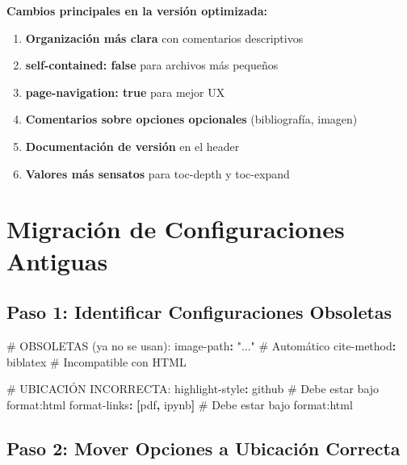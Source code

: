 \documentclass[
  doc,
  floatsintext,
  longtable,
  a4paper,
  nolmodern,
  notxfonts,
  notimes,
  12pt,
  colorlinks=true,linkcolor=blue,citecolor=blue,urlcolor=blue]{apa7}
\newenvironment{Shaded}{\begin{snugshade}}{\end{snugshade}}
\newcommand{\AttributeTok}[1]{\textcolor[rgb]{0.40,0.45,0.13}{#1}}
\newcommand{\CommentTok}[1]{\textcolor[rgb]{0.37,0.37,0.37}{#1}}
\newcommand{\FunctionTok}[1]{\textcolor[rgb]{0.28,0.35,0.67}{#1}}
\newcommand{\KeywordTok}[1]{\textcolor[rgb]{0.00,0.23,0.31}{\textbf{#1}}}
\newcommand{\StringTok}[1]{\textcolor[rgb]{0.13,0.47,0.30}{#1}}
\providecommand{\tightlist}{%
  \setlength{\itemsep}{0pt}\setlength{\parskip}{0pt}}
\begin{document}
\textbf{Cambios principales en la versión optimizada:}

\begin{enumerate}
\def\labelenumi{\arabic{enumi}.}
\tightlist
\item
  \textbf{Organización más clara} con comentarios descriptivos
\item
  \textbf{self-contained: false} para archivos más pequeños
\item
  \textbf{page-navigation: true} para mejor UX
\item
  \textbf{Comentarios sobre opciones opcionales} (bibliografía, imagen)
\item
  \textbf{Documentación de versión} en el header
\item
  \textbf{Valores más sensatos} para toc-depth y toc-expand
\end{enumerate}

\section{Migración de Configuraciones
Antiguas}\label{migraciuxf3n-de-configuraciones-antiguas}

\subsection{Paso 1: Identificar Configuraciones
Obsoletas}\label{paso-1-identificar-configuraciones-obsoletas}

\begin{Shaded}
\begin{Highlighting}[]
\CommentTok{\#  OBSOLETAS (ya no se usan):}
\FunctionTok{image{-}path}\KeywordTok{:}\AttributeTok{ }\StringTok{"..."}\CommentTok{                        \# Automático}
\FunctionTok{cite{-}method}\KeywordTok{:}\AttributeTok{ biblatex}\CommentTok{                    \# Incompatible con HTML}

\CommentTok{\#  UBICACIÓN INCORRECTA:}
\FunctionTok{highlight{-}style}\KeywordTok{:}\AttributeTok{ github}\CommentTok{                  \# Debe estar bajo format:html}
\FunctionTok{format{-}links}\KeywordTok{:}\AttributeTok{ }\KeywordTok{[}\AttributeTok{pdf}\KeywordTok{,}\AttributeTok{ ipynb}\KeywordTok{]}\CommentTok{               \# Debe estar bajo format:html}
\end{Highlighting}
\end{Shaded}

\subsection{Paso 2: Mover Opciones a Ubicación
Correcta}\label{paso-2-mover-opciones-a-ubicaciuxf3n-correcta}
\end{document}
